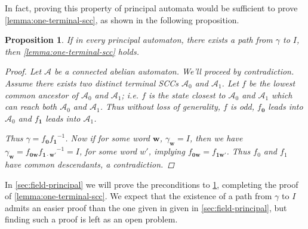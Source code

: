 \documentclass[12pt, letterpaper]{article}
\newcommand{\A}{\mathcal A}
\newcommand{\ch}[1]{\mathbf{#1}}
\newcommand{\res}[2]{{{#1}_{\ch{#2}}}}
\newtheorem{prop}[thm]{Proposition}
\begin{document}
In fact, proving this property of principal automata would be sufficient to
prove \cref{lemma:one-terminal-scc}, as shown in the following proposition.
\begin{prop}\label{prop:path-exist-gamma-delta}
    If in every principal automaton, there exists a path from $\gamma$ to
    $I$, then \cref{lemma:one-terminal-scc} holds.
    \begin{proof}
        Let $\A$ be a connected abelian automaton. We'll proceed by
        contradiction. Assume there exists two distinct terminal SCCs
        $\A_0$ and $\A_1$. Let $f$ be the lowest common ancestor of
        $\A_0$ and $\A_1$; i.e. $f$ is the state closest to $\A_0$ and
        $\A_1$ which can reach both $\A_0$ and $\A_1$. Thus without
        loss of generality, $f$ is odd, $\res{f}{0}$ leads into $\A_0$ and
        $\res{f}{1}$ leads into $\A_1$.
        \begin{center}
        \end{center}
        Thus $\gamma = \res{f}{0} \res{f}{1}^{-1}$. Now if for some
        word $\ch{w}$, $\res{\gamma}{w} = I$, then we have
        $\res{\gamma}{w} = \res{f}{0w} \res{f}{1 \cdot w'}^{-1} = I$, for
        some word $w'$, implying $\res{f}{0w} = \res{f}{1w'}$. Thus $f_0$
        and $f_1$ have common descendants, a contradiction.
    \end{proof}
\end{prop}

In \cref{sec:field-principal} we will prove the preconditions to
\cref{prop:path-exist-gamma-delta}, completing the proof of
\cref{lemma:one-terminal-scc}. We expect that the existence of a path from
$\gamma$ to $I$ admits an easier proof than the one given in given in
\cref{sec:field-principal}, but finding such a proof is left as an open
problem.
\end{document}
